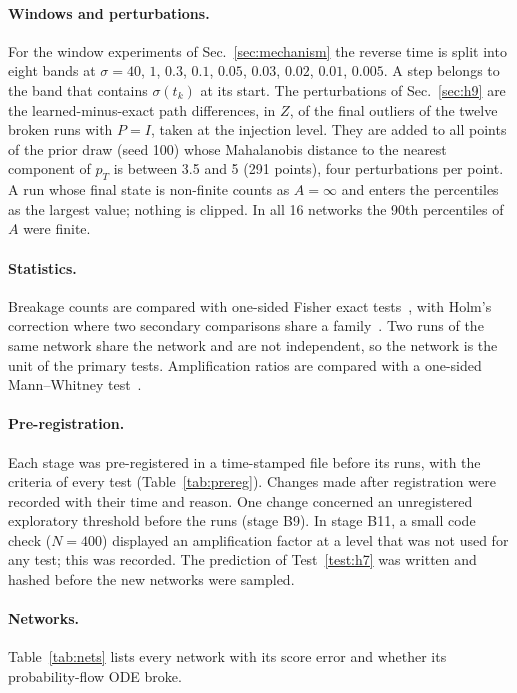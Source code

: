 \paragraph*{Windows and perturbations.}
For the window experiments of Sec.~\ref{sec:mechanism} the reverse time is split into eight bands at $\sigma=40$, $1$, $0.3$, $0.1$, $0.05$, $0.03$, $0.02$, $0.01$, $0.005$.
A step belongs to the band that contains $\sigma(t_k)$ at its start.
The perturbations of Sec.~\ref{sec:h9} are the learned-minus-exact path differences, in $Z$, of the final outliers of the twelve broken runs with $P=I$, taken at the injection level.
They are added to all points of the prior draw (seed 100) whose Mahalanobis distance to the nearest component of $p_T$ is between 3.5 and 5 (291 points), four perturbations per point.
A run whose final state is non-finite counts as $A=\infty$ and enters the percentiles as the largest value; nothing is clipped. In all 16 networks the 90th percentiles of $A$ were finite.

\paragraph*{Statistics.}
Breakage counts are compared with one-sided Fisher exact tests~\cite{fisher1922}, with Holm's correction where two secondary comparisons share a family~\cite{holm1979}.
Two runs of the same network share the network and are not independent, so the network is the unit of the primary tests.
Amplification ratios are compared with a one-sided Mann--Whitney test~\cite{mannwhitney1947}.

\paragraph*{Pre-registration.}
Each stage was pre-registered in a time-stamped file before its runs, with the criteria of every test (Table~\ref{tab:prereg}).
Changes made after registration were recorded with their time and reason.
One change concerned an unregistered exploratory threshold before the runs (stage B9).
In stage B11, a small code check ($N=400$) displayed an amplification factor at a level that was not used for any test; this was recorded.
The prediction of Test~\ref{test:h7} was written and hashed before the new networks were sampled.

\paragraph*{Networks.}
Table~\ref{tab:nets} lists every network with its score error and whether its probability-flow ODE broke.

